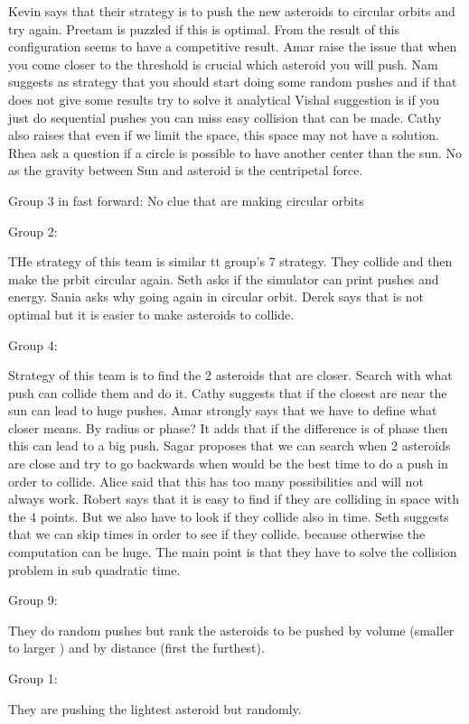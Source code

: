 Kevin says that their strategy is to push the new asteroids to circular orbits and try again.
Preetam is puzzled if this is optimal.
From the result of this configuration seems to have a competitive result.
Amar raise the issue that when you come closer to the threshold is crucial which asteroid you will push.
Nam suggests as strategy that you should start doing some random pushes and if that does not give some results try to solve it analytical
Vishal suggestion is if you just do sequential pushes you can miss easy collision that can be made.
Cathy also raises that even if we limit the space, this space may not have a solution.
Rhea ask a question if a circle is possible to have another center than the sun. No as the gravity between Sun and asteroid is the centripetal force. 

Group 3 in fast forward:
No clue that are making circular orbits

Group 2:

THe strategy of this team is similar tt group’s 7 strategy. They collide and then make the prbit circular again.
Seth asks if the simulator can print pushes and energy.
Sania asks why going again in circular orbit.
Derek says that is not optimal but it is easier to make asteroids to collide.

Group 4:

Strategy of this team is to find the 2 asteroids that are closer. Search with what push can collide them and do it. 
Cathy suggests that if the closest are near the sun can lead to huge pushes.
Amar strongly says that we have to define what closer means. By radius or phase?
It adds that if the difference is of phase then this can lead to a big push.
Sagar proposes that we can search when 2 asteroids are close and try to go backwards when would be the best time to do a push in order to collide.
Alice said that this has too many possibilities and will not always work.
Robert says that it is easy to find if they are colliding in space with the 4 points. But we also have to look if they collide also in time.
Seth suggests that we can skip times in order to see if they collide. because otherwise the computation can be huge.
The main point is that they have to solve the collision problem in sub quadratic time.


Group 9:

They do random pushes but rank the asteroids to be pushed by volume (smaller to larger ) and by distance (first the furthest).

Group 1:

They are pushing the lightest asteroid but randomly. 

